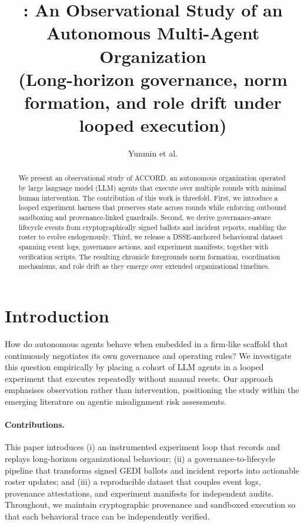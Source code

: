 \documentclass[11pt]{article}
\title{\Project: An Observational Study of an Autonomous Multi-Agent Organization\\
\large(Long-horizon governance, norm formation, and role drift under looped execution)}
\author{Yunmin et al.}
\date{\SnapshotDate}
\newcommand{\Project}{ACCORD}
\begin{document}
\maketitle

\begin{abstract}
We present an observational study of \Project, an autonomous organization operated by large language model (LLM) agents that execute over multiple rounds with minimal human intervention. The contribution of this work is threefold. First, we introduce a looped experiment harness that preserves state across rounds while enforcing outbound sandboxing and provenance-linked guardrails. Second, we derive governance-aware lifecycle events from cryptographically signed ballots and incident reports, enabling the roster to evolve endogenously. Third, we release a DSSE-anchored behavioural dataset spanning event logs, governance actions, and experiment manifests, together with verification scripts. The resulting chronicle foregrounds norm formation, coordination mechanisms, and role drift as they emerge over extended organizational timelines.
\end{abstract}

\section{Introduction}
How do autonomous agents behave when embedded in a firm-like scaffold that continuously negotiates its own governance and operating rules? We investigate this question empirically by placing a cohort of LLM agents in a looped experiment that executes repeatedly without manual resets. Our approach emphasises observation rather than intervention, positioning the study within the emerging literature on agentic misalignment risk assessments.

\paragraph{Contributions.} This paper introduces (i) an instrumented experiment loop that records and replays long-horizon organizational behaviour; (ii) a governance-to-lifecycle pipeline that transforms signed GEDI ballots and incident reports into actionable roster updates; and (iii) a reproducible dataset that couples event logs, provenance attestations, and experiment manifests for independent audits. Throughout, we maintain cryptographic provenance and sandboxed execution so that each behavioral trace can be independently verified.
\end{document}
